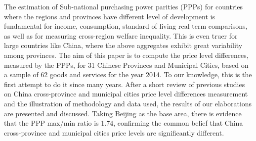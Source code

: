 The estimation of Sub-national purchasing power parities (PPPs) for countries where the regions and provinces have different level of development is fundamental for income, consumption, standard of living real term comparisons, as well as for measuring cross-region welfare inequality. This is even truer for large countries like China, where the above aggregates exhibit great variability among provinces. The aim of this paper is to compute the price level differences, measured by the PPPs, for 31 Chinese Provinces and Municipal Cities, based on a sample of 62 goods and services for the year 2014. To our knowledge, this is the first attempt to do it since many years. After a short review of previous studies on China cross-province and municipal cities price level differences measurement and the illustration of methodology and data used, the results of our elaborations are presented and discussed. Taking Beijing as the base area, there is evidence that the PPP max/min ratio is 1.74, confirming the common belief that China cross-province and municipal cities price levels are significantly different.

